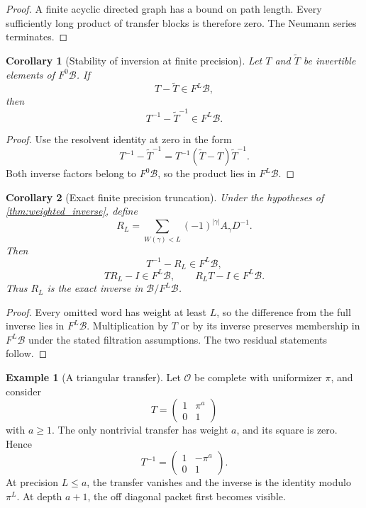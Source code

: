 \documentclass[11pt,a4paper]{article}
\newtheorem{corollary}[corollary]{Corollary}
\theoremstyle{definition}
\newtheorem{example}[example]{Example}
\theoremstyle{remark}
\newcommand{\OO}{\mathcal O}
\newcommand{\Bcal}{\mathcal B}
\providecommand{\OO}{\mathcal O}
\theoremstyle{definition}\newtheorem{construction}[theorem]{Construction}\newtheorem{certificate}[theorem]{Numerical Certificate}
\theoremstyle{remark}\newtheorem{boundary}[theorem]{Boundary}
\begin{document}
\begin{proof}
A finite acyclic directed graph has a bound on path length.  Every sufficiently long product of transfer blocks is therefore zero.  The Neumann series terminates.
\end{proof}

\begin{corollary}[Stability of inversion at finite precision]\label{cor:inverse_stability}
Let $T$ and $\widetilde T$ be invertible elements of $F^0\Bcal$.  If
\[
T-\widetilde T\in F^L\Bcal,
\]
then
\[
T^{-1}-\widetilde T^{-1}\in F^L\Bcal.
\]
\end{corollary}

\begin{proof}
Use the resolvent identity at zero in the form
\[
T^{-1}-\widetilde T^{-1}
=
T^{-1}(\widetilde T-T)\widetilde T^{-1}.
\]
Both inverse factors belong to $F^0\Bcal$, so the product lies in $F^L\Bcal$.
\end{proof}

\begin{corollary}[Exact finite precision truncation]\label{cor:finite_precision}
Under the hypotheses of \cref{thm:weighted_inverse}, define
\[
R_L
=
\sum_{W(\gamma)<L}(-1)^{|\gamma|}A_\gamma D^{-1}.
\]
Then
\[
T^{-1}-R_L\in F^L\Bcal,
\]
\[
TR_L-I\in F^L\Bcal,
\qquad
R_LT-I\in F^L\Bcal.
\]
Thus $R_L$ is the exact inverse in $\Bcal/F^L\Bcal$.
\end{corollary}

\begin{proof}
Every omitted word has weight at least $L$, so the difference from the full inverse lies in $F^L\Bcal$.  Multiplication by $T$ or by its inverse preserves membership in $F^L\Bcal$ under the stated filtration assumptions.  The two residual statements follow.
\end{proof}

\begin{example}[A triangular transfer]\label{ex:triangular_transfer}
Let $\OO$ be complete with uniformizer $\pi$, and consider
\[
T=
\begin{pmatrix}
1&\pi^a\\
0&1
\end{pmatrix}
\]
with $a\geq1$.  The only nontrivial transfer has weight $a$, and its square is zero.  Hence
\[
T^{-1}
=
\begin{pmatrix}
1&-\pi^a\\
0&1
\end{pmatrix}.
\]
At precision $L\leq a$, the transfer vanishes and the inverse is the identity modulo $\pi^L$.  At depth $a+1$, the off diagonal packet first becomes visible.
\end{example}
\end{document}
